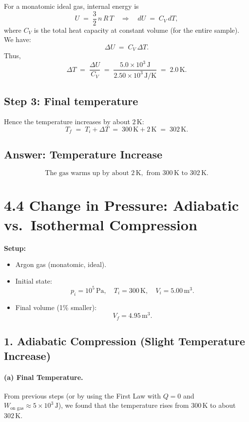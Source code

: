 \documentclass[12pt]{article}
\theoremstyle{definition} %
\theoremstyle{plain} %
\begin{document}
For a monatomic ideal gas, internal energy is
\[
U 
\;=\; 
\frac{3}{2}\,n\,R\,T 
\quad
\Longrightarrow
\quad
dU
\;=\;
C_V\,dT,
\]
where $C_V$ is the total heat capacity at constant volume (for the entire sample). 
We have:
\[
\Delta U 
\;=\;
C_V \,\Delta T.
\]
Thus,
\[
\Delta T
\;=\;
\frac{\Delta U}{C_V}
\;=\;
\frac{5.0\times 10^3\,\mathrm{J}}{2.50 \times 10^3\,\mathrm{J/K}}
\;=\;
2.0\,\mathrm{K}.
\]

\subsection*{Step 3: Final temperature}

Hence the temperature increases by about $2\,\mathrm{K}$:
\[
T_f 
\;=\; 
T_i + \Delta T
\;=\;
300\,\mathrm{K} + 2\,\mathrm{K}
\;=\;
302\,\mathrm{K}.
\]

\subsection*{Answer: Temperature Increase}

\[
\boxed{
\text{The gas warms up by about }2\,\mathrm{K}, 
\text{ from }300\,\mathrm{K} \text{ to }302\,\mathrm{K}.
}
\]

\section*{4.4 Change in Pressure: Adiabatic vs.\ Isothermal Compression}

\noindent
\textbf{Setup:}
\begin{itemize}
  \item Argon gas (monatomic, ideal).
  \item Initial state: 
  \[
    p_i = 10^5\,\mathrm{Pa}, 
    \quad
    T_i = 300\,\mathrm{K}, 
    \quad
    V_i = 5.00\,\mathrm{m^3}.
  \]
  \item Final volume (1\% smaller): 
  \[
    V_f = 4.95\,\mathrm{m^3}.
  \]
\end{itemize}

\subsection*{1. Adiabatic Compression (Slight Temperature Increase)}

\paragraph{(a) Final Temperature.}
From previous steps (or by using the First Law with $Q=0$ and $W_{\text{on gas}} \approx 5\times10^3\,\mathrm{J}$), 
we found that the temperature rises from $300\,\mathrm{K}$ to about $302\,\mathrm{K}$. 
\end{document}
